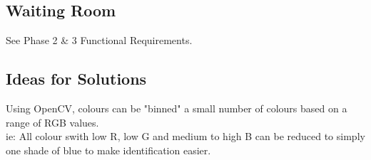 \documentclass{article}
\begin{document}
\subsection{Waiting Room}
See Phase 2 \& 3 Functional Requirements.

\subsection{Ideas for Solutions}
Using OpenCV, colours can be "binned" a small number of colours based on a range of RGB values. \\ 
ie: All colour swith low R, low G and medium to high B can be reduced to simply one shade of blue to make identification easier. \\
\end{document}
